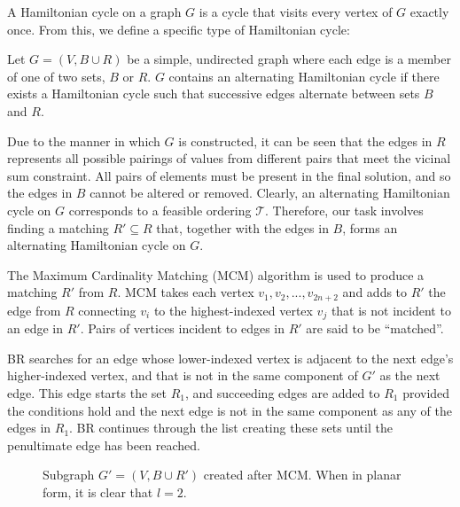 \documentclass{elsarticle}
\begin{document}
A Hamiltonian cycle on a graph $G$ is a cycle that visits every vertex of $G$ exactly once. From this, we define a specific type of Hamiltonian cycle:

\begin{definition}
	\label{defn:althamcycle}
	Let $G = (V, B \cup R)$ be a simple, undirected graph where each edge is a member of one of two sets, $B$ or $R$. $G$ contains an alternating Hamiltonian cycle if there exists a Hamiltonian cycle such that successive edges alternate between sets $B$ and $R$.
\end{definition}

Due to the manner in which $G$ is constructed, it can be seen that the edges in $R$ represents all possible pairings of values from different pairs that meet the vicinal sum constraint. All pairs of elements must be present in the final solution, and so the edges in $B$ cannot be altered or removed. Clearly, an alternating Hamiltonian cycle on $G$ corresponds to a feasible ordering $\mathcal{T}$. Therefore, our task involves finding a matching $R' \subseteq R$ that, together with the edges in $B$, forms an alternating Hamiltonian cycle on $G$.

The Maximum Cardinality Matching (MCM) algorithm is used to produce a matching $R'$ from $R$. MCM takes each vertex $v_1, v_2,...,v_{2n+2}$ and adds to $R'$ the edge from $R$ connecting $v_i$ to the highest-indexed vertex $v_j$ that is not incident to an edge in $R'$. Pairs of vertices incident to edges in $R'$ are said to be ``matched''.

BR searches for an edge whose lower-indexed vertex is adjacent to the next edge's higher-indexed vertex, and that is not in the same component of $G'$ as the next edge. This edge starts the set $R_1$, and succeeding edges are added to $R_1$ provided the conditions hold and the next edge is not in the same component as any of the edges in $R_1$. BR continues through the list creating these sets until the penultimate edge has been reached. 

\begin{figure}[H]	
	\centering
	\begin{subfigure}[h]{0.4\textwidth}
		
	\end{subfigure} \quad
	\begin{subfigure}[h]{0.4\textwidth}
		
	\end{subfigure}
	\caption{Subgraph $G'= (V, B \cup R')$ created after MCM. When in planar form, it is clear that $l = 2$.}
	\label{fig:mps}
\end{figure}
\end{document}
